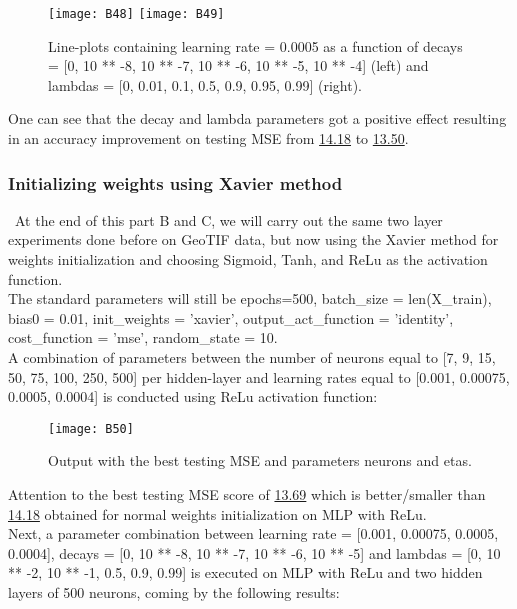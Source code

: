 \begin{figure}[H]
\label{fig:B31}
\centering
\texttt{[image: B48]}
\texttt{[image: B49]}
\caption{Line-plots containing learning rate = 0.0005 as a function of decays = [0, 10 ** -8, 10 ** -7, 10 ** -6, 10 ** -5, 10 ** -4] (left) and lambdas = [0, 0.01, 0.1, 0.5, 0.9, 0.95, 0.99] (right).}
\end{figure}

One can see that the decay and lambda parameters got a positive effect resulting in an accuracy improvement on testing MSE from \hyperref[fig:B25]{14.18} to \hyperref[fig:B31]{13.50}.

\subsubsection{Initializing weights using Xavier method}
\label{chap:Initializing weights using Xavier method}

\qquad \, At the end of this part B and C, we will carry out the same two layer experiments done before on GeoTIF data, but now using the Xavier method for weights initialization and choosing Sigmoid, Tanh, and ReLu as the activation function.\\

The standard parameters will still be epochs=500, batch\_size = len(X\_train), bias0 = 0.01, init\_weights = 'xavier', output\_act\_function = 'identity', cost\_function = 'mse', random\_state = 10.\\

A combination of parameters between the number of neurons equal to [7, 9, 15, 50, 75, 100, 250, 500] per hidden-layer and learning rates equal to [0.001, 0.00075, 0.0005, 0.0004] is conducted using ReLu activation function:

\begin{figure}[H]
\label{fig:B32}
\centering
\texttt{[image: B50]}
\caption{Output with the best testing MSE and parameters neurons and etas.}
\end{figure}

Attention to the best testing MSE score of \hyperref[fig:B32]{13.69} which is better/smaller than \hyperref[fig:B25]{14.18} obtained for normal weights initialization on MLP with ReLu.\\

Next, a parameter combination between learning rate = [0.001, 0.00075, 0.0005, 0.0004], decays = [0, 10 ** -8, 10 ** -7, 10 ** -6, 10 ** -5] and lambdas = [0, 10 ** -2, 10 ** -1, 0.5, 0.9, 0.99] is executed on MLP with ReLu and two hidden layers of 500 neurons, coming by the following results:

